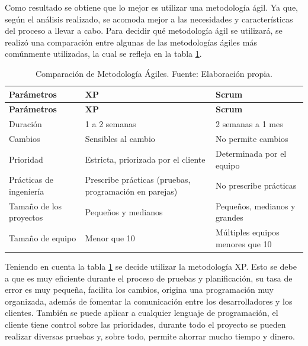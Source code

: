 Como resultado se obtiene que lo mejor es utilizar una metodología ágil. Ya que, 
según el análisis realizado, se acomoda mejor a las necesidades y características 
del proceso a llevar a cabo. Para decidir qué metodología ágil se utilizará, se realizó 
una comparación entre algunas de las metodologías ágiles más comúnmente utilizadas, 
la cual se refleja en la tabla \ref{tab:comparacionAgil}.
    
    
\begin{longtable}{|p{3.8cm}|p{6.3cm}|p{4.9cm}|}
	\caption[Comparación de Metodología Ágiles. Fuente: Elaboración propia]{Comparación de Metodología Ágiles. Fuente: Elaboración propia.}
	\label{tab:comparacionAgil} \\

	\hline
	\rowcolor[HTML]{CBCEFB} 
	\textbf{Parámetros} & \textbf{XP} & \textbf{Scrum} \\
	\hline
	\endfirsthead
    	
    \hline
    \rowcolor[HTML]{CBCEFB} 
    \textbf{Parámetros} & \textbf{XP} & \textbf{Scrum} \\
    \hline
    \endhead
    	
    \hline
    Duración & 1 a 2 semanas & 2 semanas a 1 mes \\ 
    \hline
    \rowcolor[HTML]{EDEBF1}
    Cambios & Sensibles al cambio & No permite cambios \\ 
    \hline
    Prioridad & Estricta, priorizada por el cliente & Determinada por el equipo \\ 
    \hline
    \rowcolor[HTML]{EDEBF1}
    Prácticas de ingeniería & Prescribe prácticas (pruebas, programación en parejas) & No prescribe prácticas \\ 
    \hline
    Tamaño de los proyectos & Pequeños y medianos & Pequeños, medianos y grandes \\ 
    \hline
    \rowcolor[HTML]{EDEBF1}
    Tamaño de equipo & Menor que 10 & Múltiples equipos menores que 10 \\ 
    \hline
\end{longtable}
    
Teniendo en cuenta la tabla \ref{tab:comparacionAgil} se decide utilizar la 
metodología \ac{XP}. Esto se debe a que es muy eficiente durante el proceso de 
pruebas y planificación, su tasa de error es muy pequeña, facilita los cambios, 
origina una programación muy organizada, además de fomentar la comunicación entre 
los desarrolladores y los clientes. También se puede aplicar a cualquier lenguaje 
de programación, el cliente tiene control sobre las prioridades, durante todo el 
proyecto se pueden realizar diversas pruebas y, sobre todo, permite ahorrar mucho 
tiempo y dinero.
    
